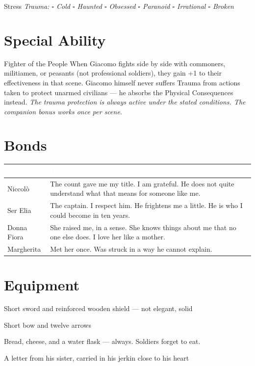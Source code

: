 \medskip
\begin{pgclockbox}{Stress \hfill {}}
\small\textit{Trauma: $\square$ Cold \quad $\square$ Haunted \quad $\square$ Obsessed \quad $\square$ Paranoid \quad $\square$ Irrational \quad $\square$ Broken}
\end{pgclockbox}

\section*{Special Ability}
\begin{fieschibox}{Fighter of the People}
When Giacomo fights side by side with commoners, militiamen, or peasants (not
professional soldiers), they gain +1 to their effectiveness in that scene. Giacomo
himself never suffers Trauma from actions taken to protect unarmed civilians --- he
absorbs the Physical Consequences instead.
\textit{The trauma protection is always active under the stated conditions. The companion bonus works once per scene.}
\end{fieschibox}

\section*{Bonds}
\begin{table}[h]\centering\renewcommand{\arraystretch}{1.4}
\begin{tabularx}{\linewidth}{@{}L{2.6cm} X@{}}
\toprule{}
\textcolor{white}{\textbf{PC}} & \textcolor{white}{\textbf{Bond}} \\
\midrule
Niccol\`o & The count gave me my title. I am grateful. He does not quite understand what that means for someone like me. \\
Ser Elia & The captain. I respect him. He frightens me a little. He is who I could become in ten years. \\
Donna Fiora & She raised me, in a sense. She knows things about me that no one else does. I love her like a mother. \\
Margherita & Met her once. Was struck in a way he cannot explain. \\
\bottomrule
\end{tabularx}
\end{table}

\section*{Equipment}
\begin{goldlist}
\item Short sword and reinforced wooden shield --- not elegant, solid
\item Short bow and twelve arrows
\item Bread, cheese, and a water flask --- always. Soldiers forget to eat.
\item A letter from his sister, carried in his jerkin close to his heart
\end{goldlist}

